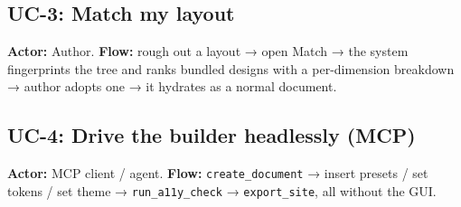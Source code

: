 \subsection*{UC-3: Match my layout}
\textbf{Actor:} Author. \textbf{Flow:} rough out a layout → open Match → the system
fingerprints the tree and ranks bundled designs with a per-dimension breakdown →
author adopts one → it hydrates as a normal document.

\subsection*{UC-4: Drive the builder headlessly (MCP)}
\textbf{Actor:} MCP client / agent. \textbf{Flow:} \texttt{create\_document} →
insert presets / set tokens / set theme → \texttt{run\_a11y\_check} →
\texttt{export\_site}, all without the GUI.

